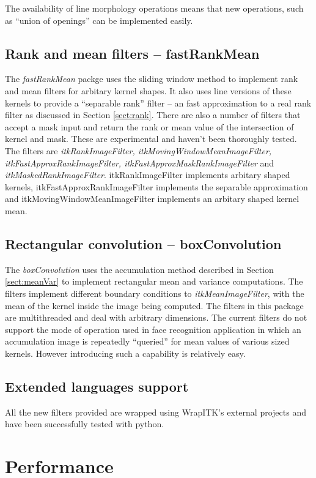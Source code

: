 \documentclass[a4paper]{InsightArticle}
\begin{document}
The availability of line morphology operations means that new
operations, such as ``union of openings'' can be implemented easily.

\subsection{Rank and mean filters -- fastRankMean}
The {\em fastRankMean} packge uses the sliding window method to
implement rank and mean filters for arbitary kernel shapes. It also
uses line versions of these kernels to provide a ``separable rank''
filter -- an fast approximation to a real rank filter as discussed in
Section \ref{sect:rank}. There are also a number of filters that
accept a mask input and return the rank or mean value of the
intersection of kernel and mask. These are experimental and haven't
been thoroughly tested. The filters are {\em itkRankImageFilter,
itkMovingWindowMeanImageFilter, itkFastApproxRankImageFilter,
itkFastApproxMaskRankImageFilter} and {\em
itkMaskedRankImageFilter}. itkRankImageFilter implements arbitary
shaped kernels, itkFastApproxRankImageFilter implements the separable
approximation and itkMovingWindowMeanImageFilter implements an
arbitary shaped kernel mean.

\subsection{Rectangular convolution -- boxConvolution}
The {\em boxConvolution} uses the accumulation method described in
Section \ref{sect:meanVar} to implement rectangular mean and variance
computations. The filters implement different boundary conditions to
{\em itkMeanImageFilter}, with the mean of the kernel inside the image
being computed. The filters in this package are multithreaded and deal
with arbitrary dimensions. The current filters do not support the mode
of operation used in face recognition application in which an
accumulation image is repeatedly ``queried'' for mean values of
various sized kernels. However introducing such a capability is
relatively easy.

\subsection{Extended languages support}

All the new filters provided are wrapped using WrapITK's external projects
\cite{WrapITK} and have been successfully tested with python.

\section{Performance}
\end{document}

